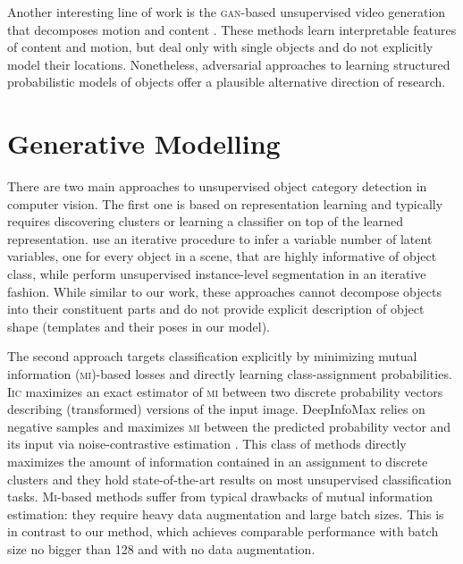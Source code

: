 	Another interesting line of work is the \textsc{gan}-based unsupervised video generation that decomposes motion and content \citep{Tulyakov2017mocogan,Denton2017unsupervised}. These methods learn interpretable features of content and motion, but deal only with single objects and do not explicitly model their locations. Nonetheless, adversarial approaches to learning structured probabilistic models of objects offer a plausible alternative direction of research.



\section{Generative Modelling}
\label{sec:gen_modelling}

	There are two main approaches to unsupervised object category detection in computer vision.
	The first one is based on representation learning and typically requires discovering clusters or learning a classifier on top of the learned representation.
	\cite{Eslami2016air,Kosiorek2018sqair} use an iterative procedure to infer a variable number of latent variables, one for every object in a scene, that are highly informative of object class, while \cite{Greff2019multi,Burgess2019monet} perform unsupervised instance-level segmentation in an iterative fashion.
	While similar to our work, these approaches cannot decompose objects into their constituent parts and do not provide explicit description of object shape (\!\eg templates and their poses in our model).
	
	The second approach targets classification explicitly by minimizing mutual information (\textsc{mi})-based losses and directly learning class-assignment probabilities.
	\textsc{Iic} \citep{Ji2018iic} maximizes an exact estimator of \textsc{mi} between two discrete probability vectors describing (transformed) versions of the input image.
	DeepInfoMax \citep{Hjelm2019deepinfomax} relies on negative samples and maximizes \textsc{mi} between the predicted probability vector and its input via noise-contrastive estimation \citep{Gutmann2010nce}.
	This class of methods directly maximizes the amount of information contained in an assignment to discrete clusters and they hold state-of-the-art results on most unsupervised classification tasks.
	\textsc{Mi}-based methods suffer from typical drawbacks of mutual information estimation: they require heavy data augmentation and large batch sizes.
	This is in contrast to our method, which achieves comparable performance with batch size no bigger than 128 and with no data augmentation.
	
